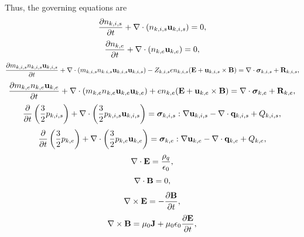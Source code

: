 \documentclass[a4paper,11pt]{report}
\begin{document}
Thus, the governing equations are
\begin{equation}
    \label{eq:mf_mm_ni}
    \frac{\partial n_{k,i,s}}{\partial t} + \nabla \cdot \left ( n_{k,i,s} \mathbf{u}_{k,i,s} \right ) = 0,
\end{equation}
\begin{equation}
    \label{eq:mf_mm_ne}
    \frac{\partial n_{k,e}}{\partial t} + \nabla \cdot \left ( n_{k,e} \mathbf{u}_{k,e} \right ) = 0,
\end{equation}
\begin{equation}
    \label{eq:mf_mm_ui}
    \frac{\partial m_{k,i,s} n_{k,i,s} \mathbf{u}_{k,i,s}}{\partial t} + \nabla \cdot \left( m_{k,i,s} n_{k.i,s} \mathbf{u}_{k,i,s} \mathbf{u}_{k,i,s} \right) 
    - Z_{k,i,s} e n_{k,i,s} ( \mathbf{E} + \mathbf{u}_{k,i,s} \times \mathbf{B} ) = \nabla \cdot \bm \sigma_{k,i,s} + \mathbf{R}_{k,i,s},
\end{equation}
\begin{equation}
    \label{eq:mf_mm_ue}
    \frac{\partial m_{k,e} n_{k,e} \mathbf{u}_{k,e}}{\partial t} + \nabla \cdot \left( m_{k,e} n_{k,e} \mathbf{u}_{k,e} \mathbf{u}_{k,e} \right) + e n_{k,e} ( \mathbf{E} + \mathbf{u}_{k,e} \times \mathbf{B} ) = \nabla \cdot \bm \sigma_{k,e} + \mathbf{R}_{k,e},
\end{equation}
\begin{equation}
    \label{eq:mf_mm_iei}
    \frac{\partial}{\partial t} \left ( \frac{3}{2} p_{k,i,s} \right ) + \nabla \cdot \left ( \frac{3}{2} p_{k,i,s} \mathbf{u}_{k,i,s} \right ) = \bm \sigma_{k,i,s} : \nabla \mathbf{u}_{k,i,s} - \nabla \cdot \mathbf{q}_{k,i,s} + Q_{k,i,s},
\end{equation}
\begin{equation}
    \label{eq:mf_mm_iee}
    \frac{\partial}{\partial t} \left ( \frac{3}{2} p_{k,e} \right ) + \nabla \cdot \left ( \frac{3}{2} p_{k,e} \mathbf{u}_{k,e} \right ) = \bm \sigma_{k,e} : \nabla \mathbf{u}_{k,e} - \nabla \cdot \mathbf{q}_{k,e} + Q_{k,e},
\end{equation}
\begin{equation}
    \label{eq:mf_mm_maxwell_3}
    \nabla \cdot \mathbf{E} = \frac{\rho_q}{\epsilon_0},
\end{equation}
\begin{equation}
    \label{eq:mf_mm_maxwell_4}
    \nabla \cdot \mathbf{B} = 0,
\end{equation}
\begin{equation}
    \label{eq:mf_mm_maxwell_1}
    \nabla \times \mathbf{E} = -\frac{ \partial \mathbf{B}}{\partial t},
\end{equation}
\begin{equation}
    \label{eq:mf_mm_maxwell_2}
    \nabla \times \mathbf{B} = \mu_0 \mathbf{J} + \mu_0 \epsilon_0 \frac{\partial \mathbf{E}}{\partial t},
\end{equation}
\end{document}

